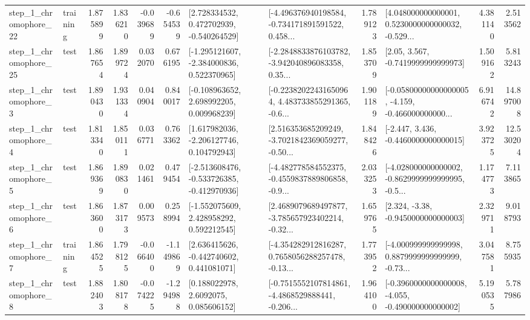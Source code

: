 \begin{tabular}{llrrrrllrlrr}
    step\_1\_chromophore\_22 &  training &      1.875899 &    1.836210 &     -0.039689 & -0.654539 &    [2.728334532, 0.472702939, -0.540264529] &  [-4.496376940198584, -0.734171891591522, 0.458... &       1.789123 &  [4.048000000000001, 0.5230000000000032, -0.529... &            4.381140 &          2.513562 \\
    step\_1\_chromophore\_25 &      test &      1.867654 &    1.899724 &      0.032070 &  0.676195 &   [-1.295121607, -2.384000836, 0.522370965] &  [-2.2848833876103782, -3.942040896083358, 0.35... &       1.853709 &                 [2.05, 3.567, -0.7419999999999973] &            1.509162 &          5.813243 \\
     step\_1\_chromophore\_3 &      test &      1.890430 &    1.931334 &      0.040904 &  0.840017 &    [-0.108963652, 2.698992205, 0.009968239] &  [-0.22382022431650964, 4.483733855291365, -0.6... &       1.901189 &  [-0.05800000000000005, -4.159, -0.466000000000... &            6.916742 &         14.897008 \\
     step\_1\_chromophore\_4 &      test &      1.813340 &    1.850111 &      0.036771 &  0.763362 &    [1.617982036, -2.206127746, 0.104792943] &  [2.516353685209249, -3.7021842369059277, -0.50... &       1.848426 &               [-2.447, 3.436, -0.4460000000000015] &            3.923725 &         12.530204 \\
     step\_1\_chromophore\_5 &      test &      1.869369 &    1.890830 &      0.021461 &  0.479454 &  [-2.513608476, -0.533726385, -0.412970936] &  [-4.482778584552375, -0.4559837889806858, -0.9... &       2.033253 &  [-4.028000000000002, -0.8629999999999995, -0.5... &            1.174773 &          7.113865 \\
     step\_1\_chromophore\_6 &      test &      1.863600 &    1.873173 &      0.009573 &  0.258994 &    [-1.552075609, 2.428958292, 0.592212545] &  [2.4689079689497877, -3.785657923402214, -0.32... &       1.659765 &                [2.324, -3.38, -0.9450000000000003] &            2.329711 &          9.018793 \\
     step\_1\_chromophore\_7 &  training &      1.864525 &    1.798125 &     -0.066400 & -1.149869 &    [2.636415626, -0.442740602, 0.441081071] &  [-4.354282912816287, 0.7658056288257478, -0.13... &       1.773952 &  [-4.000999999999998, 0.8879999999999999, -0.73... &            3.047581 &          8.755935 \\
     step\_1\_chromophore\_8 &      test &      1.882403 &    1.808178 &     -0.074225 & -1.294988 &       [0.188022978, 2.6092075, 0.085606152] &  [-0.7515552107814861, -4.4868529888441, -0.206... &       1.964100 &  [-0.3960000000000008, -4.055, -0.490000000000002] &            5.190535 &          5.787986 \\

\end{tabular}
